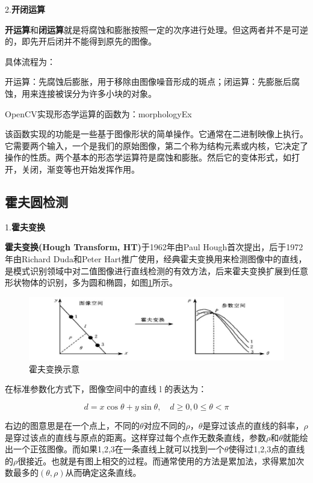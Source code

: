 2.\textbf{开闭运算}

\textbf{开运算}和\textbf{闭运算}就是将腐蚀和膨胀按照一定的次序进行处理。但这两者并不是可逆的，即先开后闭并不能得到原先的图像。

具体流程为：

开运算：先腐蚀后膨胀，用于移除由图像噪音形成的斑点；闭运算：先膨胀后腐蚀，用来连接被误分为许多小块的对象。

OpenCV实现形态学运算的函数为：morphologyEx

该函数实现的功能是一些基于图像形状的简单操作。它通常在二进制映像上执行。它需要两个输入，一个是我们的原始图像，第二个称为结构元素或内核，它决定了操作的性质。两个基本的形态学运算符是腐蚀和膨胀。然后它的变体形式，如打开，关闭，渐变等也开始发挥作用。

\subsection{霍夫圆检测}

1.\textbf{霍夫变换}

\textbf{霍夫变换(Hough Transform, HT)}于1962年由Paul Hough首次提出，后于1972年由Richard Duda和Peter Hart推⼴使⽤，经典霍夫变换⽤来检测图像中的直线，是模式识别领域中对二值图像进行直线检测的有效方法\cite{Art2}，后来霍夫变换扩展到任意形状物体的识别，多为圆和椭圆，如图\ref{Fig:img1}所示。

\begin{figure}[ht]
  \centering
  \includegraphics[width=0.8\linewidth]{./Figure/Hough_Transform.png}
  \caption{霍夫变换示意}\label{Fig:img1}
\end{figure}

在标准参数化方式下，图像空间中的直线 l 的表达为：

\begin{equation}
d=x \cos \theta+y \sin \theta, \quad d \geqslant 0,0 \leqslant \theta<\pi
\end{equation}

右边的图意思是在一个点上，不同的$\theta$对应不同的$\rho$，$\theta$是穿过该点的直线的斜率，$\rho$是穿过该点的直线与原点的距离。这样穿过每个点作无数条直线，参数$\rho$和$\theta$就能绘出一个正弦图像。而如果1,2,3在一条直线上就可以找到⼀个$\theta$使得过1,2,3点的直线的$\rho$很接近。也就是有图上相交的过程。而通常使用的方法是累加法，求得累加次数最多的$(\theta, \rho)$从而确定这条直线。

